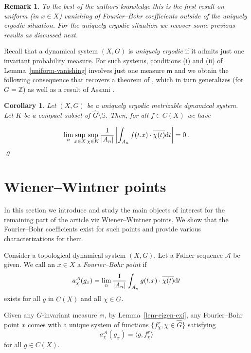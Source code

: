 \documentclass [14pt]{amsart}
\numberwithin{equation}{section}
\newcommand{\ZZ}{{\mathbb Z}}
\newcommand{\cA}{{\mathcal A}}
\newcommand{\mm}{\mathsf{m}}
\newcommand{\dd}{\mbox{\rm d}}
\newcommand{\SSS}{\mathbb S}
\newtheorem{corollary}[theorem]{Corollary}
\newtheorem{remark}[theorem]{Remark}
\begin{document}
\begin{remark} To the best of the authors knowledge this is the first result on uniform (in $x\in X$) vanishing of Fourier--Bohr coefficients outside of the uniquely ergodic situation. For the uniquely ergodic situation we recover some previous results as discussed next.
\end{remark}

Recall that a dynamical system $(X,G)$ is \textit{uniquely ergodic} if it admits just one invariant probability measure.
For such systems, conditions (i) and (ii) of Lemma~\ref{uniform-vanishing} involves just one measure $\mm$ and we obtain the following consequence that  recovers a  theorem of \cite{Len}, which in turn  generalizes \cite[Theorem~1.1]{Rob} (for $G=\ZZ$) as well as a result of Assani \cite{Ass}.

\begin{corollary} Let $(X, G)$ be a uniquely ergodic metrizable dynamical system. Let $K$ be a compact subset of $\widehat{G}\setminus \SSS$. Then, for all $f \in C(X)$ we have

\[
\lim_n \sup_{x\in X} \sup_{\chi \in K} \frac{1}{|A_n|} \left| \int_{A_n} f(t.x) \cdot \overline{\chi(t)} \dd t \right| =0  \,.
\] \qed
\end{corollary}




\section{Wiener--Wintner points}\label{sec-Strongly}
In this section we introduce and study the main objects of interest for the remaining part of the article viz Wiener--Wintner points. We show that the Fourier--Bohr coefficients exist for such points and provide various characterizations for them.

\medskip

Consider a topological dynamical system $(X,G)$. Let a F\o lner sequence $\mathcal{A}$ be given.  We call an $x\in X$ a \textit{Fourier--Bohr point} if
\[
a_\chi^\cA(g_x) = \lim_n \frac{1}{|A_n|} \int_{A_n} g(t.x) \cdot \overline{\chi(t)} \dd t
\]
exists for all $g$ in $C(X)$ and all $\chi \in \widehat{G}$.

Given any $G$-invariant measure $\mm$, by Lemma~\ref{lem-eigen-exi}, any Fourier--Bohr point $x$ comes with a unique  system of functions $\{ f_\chi^x , \chi \in \widehat{G} \}$
satisfying
\[
a_\chi^{\cA}(g_x) = \langle g, f_\chi^x\rangle
\]
for all $g\in C(X)$.
\end{document}
